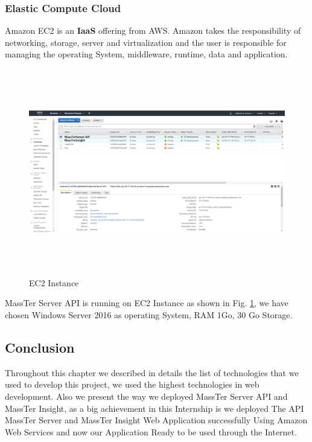 \subsubsection{Elastic Compute Cloud}
Amazon EC2 is an \textbf{IaaS} offering from AWS. Amazon takes the responsibility of networking, storage, server and virtualization and the user is responsible for managing the operating System, middleware, runtime, data and application.


\begin{figure}[!h]
	\centering
	\includegraphics[width=17cm,height=9cm]{ec2Instance.png}
	\caption{EC2 Instance}
	\label{EC2Instance}	
\end{figure} 

MassTer Server API is running on EC2 Instance as shown in Fig. \ref{EC2Instance}, we have chosen Windows Server 2016 as operating System, RAM 1Go, 30 Go Storage. 

\subsection{Conclusion}
Throughout this chapter we described in details the list of technologies that we used to develop this project, we used the highest technologies in web development. Also we present the way we deployed MassTer Server API and MassTer Insight, as a big achievement in this Internship is we  deployed The API MassTer Server and MassTer Insight Web Application successfully Using Amazon Web Services and now our Application Ready to be used through the Internet.

